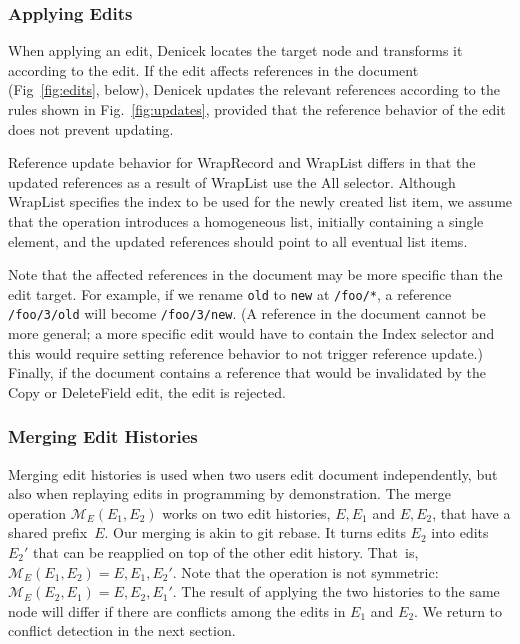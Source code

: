 \documentclass[sigconf]{acmart}
\newcommand{\ident}[1]{{\sffamily #1}}
\begin{document}
\subsubsection*{Applying Edits}
When applying an edit, Denicek locates the target node and transforms it according to the edit. If
the edit affects references in the document (Fig~\ref{fig:edits}, below), Denicek updates
the relevant references according to the rules shown in Fig.~\ref{fig:updates}, provided
that the reference behavior of the edit does not prevent updating.

Reference update behavior for \ident{WrapRecord} and \ident{WrapList} differs in that the updated
references as a result of \ident{WrapList} use the \ident{All} selector. Although \ident{WrapList}
specifies the index to be used for the newly created list item, we assume that the operation
introduces a homogeneous list, initially containing a single element, and the updated references
should point to all eventual list items.

Note that the affected references in the document may be more specific than the edit target. For
example, if we rename {\small\texttt{old}} to {\small\texttt{new}} at {\small\texttt{/foo/*}}, a reference
{\small\texttt{/foo/3/old}} will become {\small\texttt{/foo/3/new}}. (A reference in the
document cannot be more general; a more specific edit would have to contain the \ident{Index} selector
and this would require setting reference behavior to not trigger reference update.) Finally,
if the document contains a reference that would be invalidated by the \ident{Copy} or
\ident{DeleteField} edit, the edit is rejected.



\subsubsection*{Merging Edit Histories}
Merging edit histories is used when two users edit document independently, but also
when replaying edits in programming by demonstration. The merge operation $\mathcal{M}_E(E_1, E_2)$
works on two edit histories, $E, E_1$ and $E, E_2$, that have a shared prefix~$E$.
Our merging is akin to git rebase. It turns edits $E_2$ into edits $E_2'$ that can be reapplied
on top of the other edit history. That~is, $\mathcal{M}_E(E_1, E_2) = E, E_1, E_2'$.
Note that the operation is not symmetric: $\mathcal{M}_E(E_2, E_1) = E, E_2, E_1'$. The
result of applying the two histories to the same node will differ if there are conflicts
among the edits in $E_1$ and $E_2$. We return to conflict detection in the next section.
\end{document}
